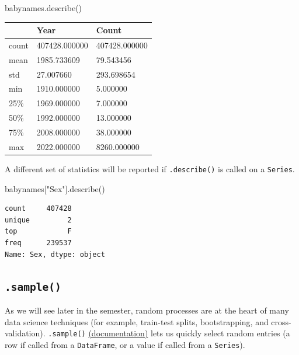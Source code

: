 \documentclass[
  letterpaper,
  DIV=11,
  numbers=noendperiod]{scrreprt}
\newenvironment{Shaded}{\begin{snugshade}}{\end{snugshade}}
\newcommand{\NormalTok}[1]{\textcolor[rgb]{0.00,0.23,0.31}{#1}}
\newcommand{\StringTok}[1]{\textcolor[rgb]{0.13,0.47,0.30}{#1}}
\begin{document}
\begin{Shaded}
\begin{Highlighting}[]
\NormalTok{babynames.describe()}
\end{Highlighting}
\end{Shaded}

\begin{longtable}[]{@{}lll@{}}
\toprule\noalign{}
& Year & Count \\
\midrule\noalign{}
\endhead
\bottomrule\noalign{}
\endlastfoot
count & 407428.000000 & 407428.000000 \\
mean & 1985.733609 & 79.543456 \\
std & 27.007660 & 293.698654 \\
min & 1910.000000 & 5.000000 \\
25\% & 1969.000000 & 7.000000 \\
50\% & 1992.000000 & 13.000000 \\
75\% & 2008.000000 & 38.000000 \\
max & 2022.000000 & 8260.000000 \\
\end{longtable}

A different set of statistics will be reported if \texttt{.describe()}
is called on a \texttt{Series}.

\begin{Shaded}
\begin{Highlighting}[]
\NormalTok{babynames[}\StringTok{"Sex"}\NormalTok{].describe()}
\end{Highlighting}
\end{Shaded}

\begin{verbatim}
count     407428
unique         2
top            F
freq      239537
Name: Sex, dtype: object
\end{verbatim}

\subsection{\texorpdfstring{\texttt{.sample()}}{.sample()}}\label{sample}

As we will see later in the semester, random processes are at the heart
of many data science techniques (for example, train-test splits,
bootstrapping, and cross-validation). \texttt{.sample()}
\href{https://pandas.pydata.org/docs/reference/api/pandas.DataFrame.sample.html}{(documentation)}
lets us quickly select random entries (a row if called from a
\texttt{DataFrame}, or a value if called from a \texttt{Series}).
\end{document}
